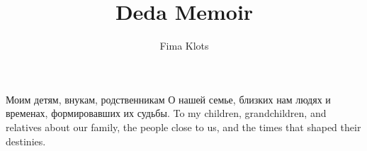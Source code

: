 \documentclass[11pt,a4paper,oneside]{book}
\begin{document}
\title{Deda Memoir}
\author{Fima Klots}
\date{}

\begin{titlepage}
  \vspace*{\fill}
  \begin{center}
      \translate
        {Моим детям, внукам, родственникам О нашей семье, близких нам людях и временах, формировавших их судьбы.}
        {To my children, grandchildren, and relatives about our family, the people close to us, and the times that shaped their destinies.}
  \end{center}
  \vspace*{\fill}
\end{titlepage}

\begin{paracol}{2}

\end{paracol}

\end{document}

